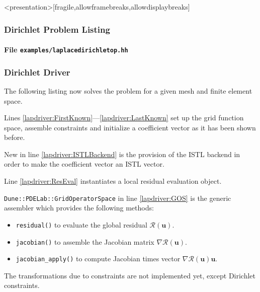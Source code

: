 \begin{frame}<presentation>[fragile,allowframebreaks,allowdisplaybreaks]
\frametitle<presentation>{Dirichlet Problem Listing}
\framesubtitle<presentation>{File \texttt{examples/laplacedirichletop.hh}}

\end{frame}

\begin{frame}
\frametitle<presentation>{Dirichlet Driver}
The following listing now solves the problem for a given mesh and
finite element space.

Lines \ref{lapdriver:FirstKnown}---\ref{lapdriver:LastKnown} set up
the grid function space, assemble constraints and initialize a
coefficient vector as it has been shown before.

New in line \ref{lapdriver:ISTLBackend} is the provision of the ISTL
backend in order to make the coefficient vector an ISTL vector.

Line \ref{lapdriver:ResEval} instantiates a local residual evaluation
object.

\lstinline{Dune::PDELab::GridOperatorSpace} in
line \ref{lapdriver:GOS} is the generic assembler which provides the
following methods:
\begin{itemize}
\item \lstinline{residual()} to evaluate the global residual
$\mathcal{R}(\mathbf{u})$.
\item \lstinline{jacobian()} to assemble the Jacobian matrix
$\nabla\mathcal{R}(\mathbf{u})$. 
\item \lstinline{jacobian_apply()} to compute Jacobian times vector
$\nabla\mathcal{R}(\mathbf{u})\mathbf{u}$. 
\end{itemize} 
The transformations due to constraints are not implemented yet, except
Dirichlet constraints.
\end{frame}

